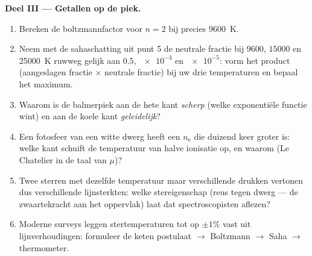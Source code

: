 \begin{problem}
\medskip\noindent\textbf{Deel III --- Getallen op de piek.}
\begin{enumerate}[resume]
  \item Bereken de boltzmannfactor voor $n = 2$ bij precies \qty{9600}{K}.
  \item Neem met de sahaschatting uit punt 5 de neutrale fractie bij
        $9600$, $15000$ en \qty{25000}{K} ruwweg gelijk aan $0.5$,
        $\num{e-3}$ en $\num{e-5}$: vorm het product (aangeslagen fractie
        $\times$ neutrale fractie) bij uw drie temperaturen en bepaal het
        maximum.
  \item Waarom is de balmerpiek aan de hete kant \emph{scherp} (welke
        exponentiële functie wint) en aan de koele kant \emph{geleidelijk}?
  \item Een fotosfeer van een witte dwerg heeft een $n_{\text{e}}$ die
        duizend keer groter is: welke kant schuift de temperatuur van halve
        ionisatie op, en waarom (Le Chatelier in de taal van $\mu$)?
  \item Twee sterren met dezelfde temperatuur maar verschillende drukken
        vertonen dus verschillende lijnsterkten: welke stereigenschap
        (reus tegen dwerg --- de zwaartekracht aan het oppervlak) laat dat
        spectroscopisten aflezen?
  \item Moderne surveys leggen stertemperaturen tot op $\pm1\%$ vast uit
        lijnverhoudingen: formuleer de keten postulaat $\to$ Boltzmann
        $\to$ Saha $\to$ thermometer.
\end{enumerate}


\end{problem}
